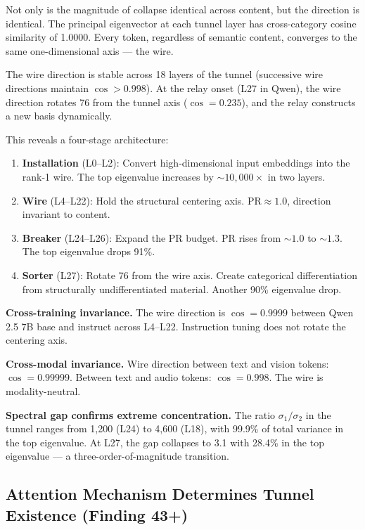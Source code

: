 \documentclass[12pt]{article}
\begin{document}
Not only is the magnitude of collapse identical across content, but the direction is identical. The principal eigenvector at each tunnel layer has cross-category cosine similarity of 1.0000. Every token, regardless of semantic content, converges to the same one-dimensional axis --- the wire.

The wire direction is stable across 18 layers of the tunnel (successive wire directions maintain $\cos > 0.998$). At the relay onset (L27 in Qwen), the wire direction rotates 76\textdegree{} from the tunnel axis ($\cos = 0.235$), and the relay constructs a new basis dynamically.

This reveals a four-stage architecture:

\begin{enumerate}
\item \textbf{Installation} (L0--L2): Convert high-dimensional input embeddings into the rank-1 wire. The top eigenvalue increases by ${\sim}10{,}000\times$ in two layers.
\item \textbf{Wire} (L4--L22): Hold the structural centering axis. $\text{PR} \approx 1.0$, direction invariant to content.
\item \textbf{Breaker} (L24--L26): Expand the PR budget. PR rises from ${\sim}1.0$ to ${\sim}1.3$. The top eigenvalue drops 91\%.
\item \textbf{Sorter} (L27): Rotate 76\textdegree{} from the wire axis. Create categorical differentiation from structurally undifferentiated material. Another 90\% eigenvalue drop.
\end{enumerate}

\textbf{Cross-training invariance.} The wire direction is $\cos = 0.9999$ between Qwen 2.5 7B base and instruct across L4--L22. Instruction tuning does not rotate the centering axis.

\textbf{Cross-modal invariance.} Wire direction between text and vision tokens: $\cos = 0.99999$. Between text and audio tokens: $\cos = 0.998$. The wire is modality-neutral.

\textbf{Spectral gap confirms extreme concentration.} The ratio $\sigma_1/\sigma_2$ in the tunnel ranges from 1,200 (L24) to 4,600 (L18), with 99.9\% of total variance in the top eigenvalue. At L27, the gap collapses to 3.1 with 28.4\% in the top eigenvalue --- a three-order-of-magnitude transition.

\subsection{Attention Mechanism Determines Tunnel Existence (Finding 43+)}
\end{document}
